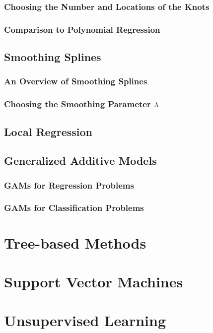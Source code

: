 \documentclass{article}
\numberwithin{equation}{section}
\begin{document}
\begin{enumerate}
\subsubsection{Choosing the Number and Locations of the Knots}
\subsubsection{Comparison to Polynomial Regression}

\subsection{Smoothing Splines}
\subsubsection{An Overview of Smoothing Splines}
\subsubsection{Choosing the Smoothing Parameter \texorpdfstring{$\lambda$}{lambda}}

\subsection{Local Regression}

\subsection{Generalized Additive Models}
\subsubsection{GAMs for Regression Problems}
\subsubsection{GAMs for Classification Problems}



\newpage
\section{Tree-based Methods}

\newpage
\section{Support Vector Machines}

\newpage
\section{Unsupervised Learning}

\end{enumerate}
\end{document}

